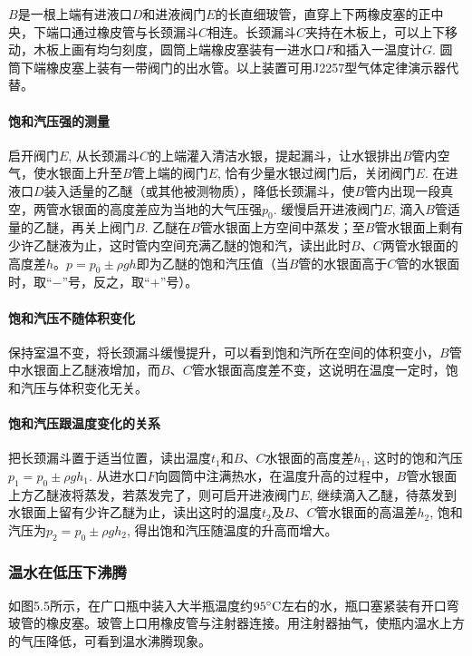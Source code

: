 $B$是一根上端有进液口$D$和进液阀门$E$的长直细玻管，直穿上下两橡皮塞的正中央，下端口通过橡皮管与长颈漏斗$C$相连。长颈漏斗$C$夹持在木板上，可以上下移动，木板上画有均匀刻度，圆筒上端橡皮塞装有一进水口$F$和插入一温度计$G$. 圆筒下端橡皮塞上装有一带阀门的出水管。以上装置可用J2257型气体定律演示器代替。

\paragraph{饱和汽压强的测量}
启开阀门$E$, 从长颈漏斗$C$的上端灌入清洁水银，提起漏斗，让水银排出$B$管内空气，使水银面上升至$B$管上端的阀门$E$, 恰有少量水银过阀门后，关闭阀门$E$. 在进液口$D$装入适量的乙醚（或其他被测物质），降低长颈漏斗，使$B$管内出现一段真空，两管水银面的高度差应为当地的大气压强$p_0$. 缓慢启开进液阀门$E$, 滴入$B$管适量的乙醚，再关上阀门$B$. 乙醚在$B$管水银面上方空间中蒸发；至$B$管水银面上剩有少许乙醚液为止，这时管内空间充满乙醚的饱和汽，读出此时$B$、$C$两管水银面的高度差$h$。$p=p_0\pm \rho gh$即为乙醚的饱和汽压值（当$B$管的水银面高于$C$管的水银面时，取“$-$”号，反之，取“$+$”号）。

\paragraph{饱和汽压不随体积变化}
保持室温不变，将长颈漏斗缓慢提升，可以看到饱和汽所在空间的体积变小，$B$管中水银面上乙醚液增加，而$B$、$C$管水银面高度差不变，这说明在温度一定时，饱和汽压与体积变化无关。

\paragraph{饱和汽压跟温度变化的关系}
把长颈漏斗置于适当位置，读出温度$t_1$和$B$、$C$水银面的高度差$h_1$, 这时的饱和汽压$p_1=p_0\pm\rho gh_1$. 从进水口$F$向圆筒中注满热水，在温度升高的过程中，$B$管水银面上方乙醚液将蒸发，若蒸发完了，则可启开进液阀门$E$, 继续滴入乙醚，待蒸发到水银面上留有少许乙醚为止，读出这时的温度$t_2$及$B$、$C$管水银面的高温差$h_2$, 饱和汽压为$p_2=p_0\pm \rho gh_2$, 得出饱和汽压随温度的升高而增大。

\subsubsection{温水在低压下沸腾}
如图5.5所示，在广口瓶中装入大半瓶温度约$95^{\circ}{\rm C}$左右的水，瓶口塞紧装有开口弯玻管的橡皮塞。玻管上口用橡皮管与注射器连接。用注射器抽气，使瓶内温水上方的气压降低，可看到温水沸腾现象。
\begin{figure}[htp]
    \centering
    \caption{}
\end{figure}

